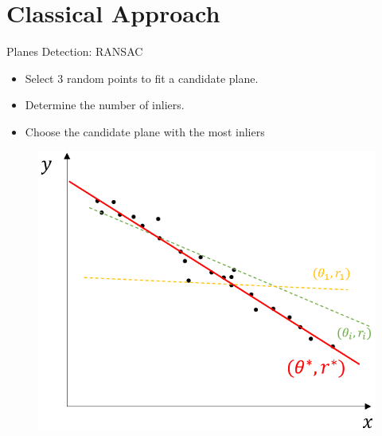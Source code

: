 \documentclass{beamer}
\begin{document}
\section{Classical Approach}

\begin{frame}{Planes Detection: RANSAC}
\begin{minipage}{\textwidth}
    \begin{minipage}{0.45\textwidth}
        \begin{itemize}
            \item Select 3 random points to fit a candidate plane.
            \item Determine the number of inliers.
            \item Choose the candidate plane with the most inliers
        \end{itemize}
    \end{minipage}
    \hfill
    \begin{minipage}{0.45\textwidth}
        \begin{figure}
            \centering
            \includegraphics[width=\textwidth,height=0.8\textheight,keepaspectratio]{img/03_RANSAC2.png}
        \end{figure}
    \end{minipage}
\end{minipage}
\end{frame}
\end{document}

